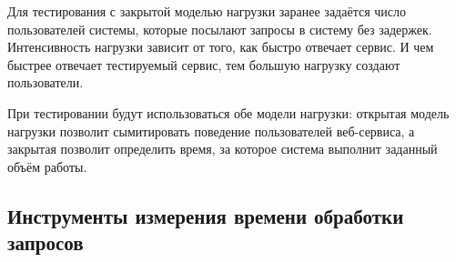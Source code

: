 
Для тестирования с закрытой моделью нагрузки заранее задаётся число пользователей системы, которые посылают запросы в систему без задержек. Интенсивность нагрузки зависит от того, как быстро отвечает сервис. И чем быстрее отвечает тестируемый сервис, тем большую нагрузку создают пользователи. 




При тестировании будут использоваться обе модели нагрузки: открытая модель нагрузки позволит сымитировать поведение пользователей веб-сервиса, а закрытая позволит определить время, за которое система выполнит заданный объём работы.



\subsection{Инструменты измерения времени обработки запросов}

